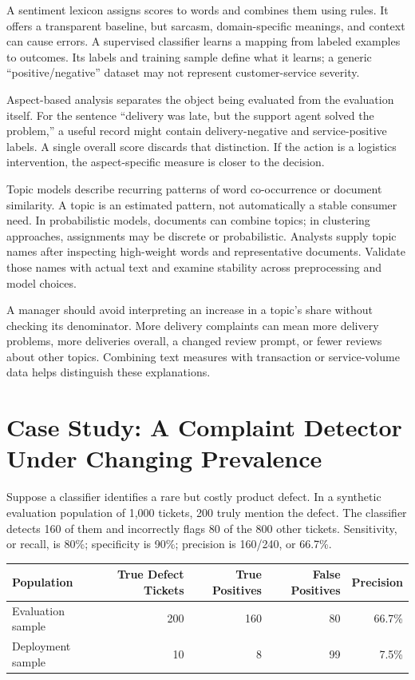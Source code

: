 \noindent A sentiment lexicon assigns scores to words and combines them using
rules. It offers a transparent baseline, but sarcasm, domain-specific
meanings, and context can cause errors. A supervised classifier learns a
mapping from labeled examples to outcomes. Its labels and training
sample define what it learns; a generic ``positive/negative'' dataset
may not represent customer-service severity.

Aspect-based analysis separates the object being evaluated from the
evaluation itself. For the sentence ``delivery was late, but the support
agent solved the problem,'' a useful record might contain
delivery-negative and service-positive labels. A single overall score
discards that distinction. If the action is a logistics intervention,
the aspect-specific measure is closer to the decision.

Topic models describe recurring patterns of word co-occurrence or
document similarity. A topic is an estimated pattern, not automatically
a stable consumer need. In probabilistic models, documents can combine
topics; in clustering approaches, assignments may be discrete or
probabilistic. Analysts supply topic names after inspecting high-weight
words and representative documents. Validate those names with actual
text and examine stability across preprocessing and model choices.

A manager should avoid interpreting an increase in a topic's share
without checking its denominator. More delivery complaints can mean more
delivery problems, more deliveries overall, a changed review prompt, or
fewer reviews about other topics. Combining text measures with
transaction or service-volume data helps distinguish these explanations.

\hypertarget{M05-case-study-a-complaint-detector-under-changing-prevalence}{%
\section{Case Study: A Complaint Detector Under Changing
Prevalence}\label{M05-case-study-a-complaint-detector-under-changing-prevalence}}

\noindent Suppose a classifier identifies a rare but costly product defect. In a
synthetic evaluation population of 1,000 tickets, 200 truly mention the
defect. The classifier detects 160 of them and incorrectly flags 80 of
the 800 other tickets. Sensitivity, or recall, is 80\%; specificity is
90\%; precision is 160/240, or 66.7\%.

\begin{table}[H]
\centering\small
\begin{tabular}{@{}lrrrr@{}}
\toprule
Population & True Defect Tickets & True Positives & False Positives &
Precision \\
\midrule

Evaluation sample & 200 & 160 & 80 & 66.7\% \\
Deployment sample & 10 & 8 & 99 & 7.5\% \\
\bottomrule
\end{tabular}
\end{table}

